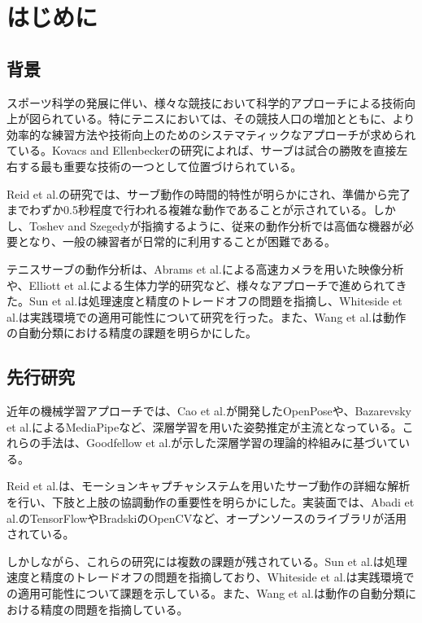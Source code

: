 \documentclass[oneside]{suribt}[11pt]
\begin{document}
\tableofcontents    %
\listoftables       %
\listoffigures      %

\mainmatter
\chapter{はじめに}

\section{背景}
スポーツ科学の発展に伴い、様々な競技において科学的アプローチによる技術向上が図られている。特にテニスにおいては、その競技人口の増加とともに、より効率的な練習方法や技術向上のためのシステマティックなアプローチが求められている。Kovacs and Ellenbecker\cite{kovacs2011}の研究によれば、サーブは試合の勝敗を直接左右する最も重要な技術の一つとして位置づけられている。

Reid et al.\cite{reid2007}の研究では、サーブ動作の時間的特性が明らかにされ、準備から完了までわずか0.5秒程度で行われる複雑な動作であることが示されている。しかし、Toshev and Szegedy\cite{toshev2014}が指摘するように、従来の動作分析では高価な機器が必要となり、一般の練習者が日常的に利用することが困難である。

テニスサーブの動作分析は、Abrams et al.\cite{abrams2018}による高速カメラを用いた映像分析や、Elliott et al.\cite{elliott2003}による生体力学的研究など、様々なアプローチで進められてきた。Sun et al.\cite{hrnet}は処理速度と精度のトレードオフの問題を指摘し、Whiteside et al.\cite{whiteside2013}は実践環境での適用可能性について研究を行った。また、Wang et al.\cite{wang2019}は動作の自動分類における精度の課題を明らかにした。

\section{先行研究}
近年の機械学習アプローチでは、Cao et al.\cite{openpose}が開発したOpenPoseや、Bazarevsky et al.\cite{mediapipe}によるMediaPipeなど、深層学習を用いた姿勢推定が主流となっている。これらの手法は、Goodfellow et al.\cite{goodfellow}が示した深層学習の理論的枠組みに基づいている。

Reid et al.\cite{serve_analysis}は、モーションキャプチャシステムを用いたサーブ動作の詳細な解析を行い、下肢と上肢の協調動作の重要性を明らかにした。実装面では、Abadi et al.\cite{tensorflow}のTensorFlowやBradski\cite{opencv}のOpenCVなど、オープンソースのライブラリが活用されている。

しかしながら、これらの研究には複数の課題が残されている。Sun et al.\cite{hrnet}は処理速度と精度のトレードオフの問題を指摘しており、Whiteside et al.\cite{whiteside2013}は実践環境での適用可能性について課題を示している。また、Wang et al.\cite{wang2019}は動作の自動分類における精度の問題を指摘している。
\end{document}
